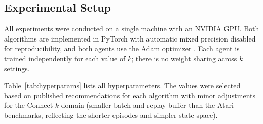 \documentclass[10pt, letterpaper, twocolumn]{article}
\begin{document}
\subsection{Experimental Setup}

All experiments were conducted on a single machine with an NVIDIA GPU.
Both algorithms are implemented in PyTorch \citep{paszke2019pytorch}
with automatic mixed precision disabled for reproducibility, and both
agents use the Adam optimizer \citep{kingma2015adam}.  Each agent is trained independently for each value of
$k$; there is no weight sharing across $k$ settings.

Table~\ref{tab:hyperparams} lists all hyperparameters.  The values were
selected based on published recommendations for each algorithm
\citep{hessel2018rainbow, schulman2017ppo} with minor adjustments for the
Connect-$k$ domain (smaller batch and replay buffer than the Atari
benchmarks, reflecting the shorter episodes and simpler state space).
\end{document}
